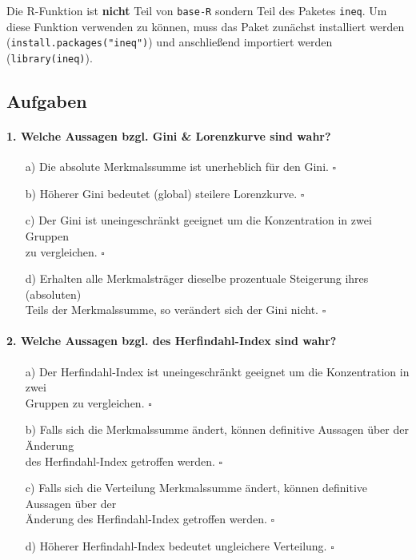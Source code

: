 \documentclass[a4paper]{article}
\newcommand\dangersign{%
 \makebox[1.8em][c]{%
 \makebox[0pt][c]{\raisebox{.15em}{\small!}}%
 \makebox[0pt][c]{\color{red}\Large$\triangle$}}}%
\begin{document}
\noindent {}

\noindent \dangersign Die R-Funktion ist \textbf{nicht} Teil von \texttt{base-R} sondern Teil des Paketes \texttt{ineq}. Um diese Funktion verwenden zu können, muss das Paket zunächst installiert werden (\texttt{install.packages("ineq")}) und anschließend importiert werden (\texttt{library(ineq)}).

\clearpage

\subsection{Aufgaben}

\paragraph{1. Welche Aussagen bzgl. Gini \& Lorenzkurve sind wahr?}

\begin{itemize}
    \item[a)] Die absolute Merkmalssumme ist unerheblich für den Gini. \hfill $\square$
    \item[b)] Höherer Gini bedeutet (global) steilere Lorenzkurve. \hfill $\square$
    \item[c)] Der Gini ist uneingeschränkt geeignet um die Konzentration in zwei Gruppen\\zu vergleichen. \hfill $\square$
    \item[d)] Erhalten alle Merkmalsträger dieselbe prozentuale Steigerung ihres (absoluten)\\Teils der Merkmalssumme, so verändert sich der Gini nicht. \hfill $\square$
\end{itemize}

\paragraph{2. Welche Aussagen bzgl. des Herfindahl-Index sind wahr?}

\begin{itemize}
    \item[a)] Der Herfindahl-Index ist uneingeschränkt geeignet um die Konzentration in zwei\\Gruppen zu vergleichen. \hfill $\square$
    \item[b)] Falls sich die Merkmalssumme ändert, können definitive Aussagen über der Änderung\\des Herfindahl-Index getroffen werden. \hfill $\square$
    \item[c)] Falls sich die Verteilung Merkmalssumme ändert, können definitive Aussagen über der\\Änderung des Herfindahl-Index getroffen werden. \hfill $\square$
    \item[d)] Höherer Herfindahl-Index bedeutet ungleichere Verteilung. \hfill $\square$
\end{itemize}
\end{document}
